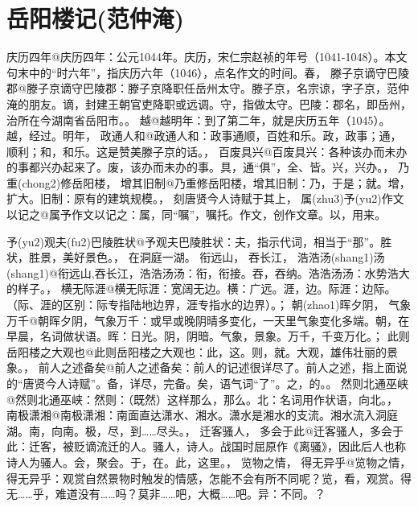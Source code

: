 \documentclass[a4paper]{article}
\begin{document}
\section[]{岳阳楼记(\fangti 范仲淹)\zynotemark{}}


庆历四年@{庆历四年：公元1044年。庆历，宋仁宗赵祯的年号（1041-1048）。本文句末中的“时六年”，指庆历六年（1046），点名作文的时间。}春，
滕子京谪守巴陵郡@{滕子京谪守巴陵郡：滕子京降职任岳州太守。滕子京，名宗谅，字子京，范仲淹的朋友。谪，封建王朝官吏降职或远调。守，指做太守。巴陵：郡名，即岳州，治所在今湖南省岳阳市。}。
越@{越明年：到了第二年，就是庆历五年（1045）。越，经过。}明年，
政通人和@{政通人和：政事通顺，百姓和乐。政，政事；通，顺利；和，和乐。这是赞美滕子京的话。}，
百废具兴@{百废具兴：各种该办而未办的事都兴办起来了。废，该办而未办的事。具，通“俱”，全、皆。兴，兴办。}，
乃重(chong2)修岳阳楼，
增其旧制@{乃重修岳阳楼，增其旧制：乃，于是；就。增，扩大。旧制：原有的建筑规模。}，
刻唐贤今人诗赋于其上，
属(zhu3)予(yu2)作文以记之@{属予作文以记之：属，同“嘱”，嘱托。作文，创作文章。以，用来}。

予(yu2)观夫(fu2)巴陵胜状@{予观夫巴陵胜状：夫，指示代词，相当于“那”。胜状，胜景，美好景色。}，
在洞庭一湖。
衔远山，
吞长江，
浩浩汤(shang1)汤(shang1)@{衔远山,吞长江，浩浩汤汤：衔，衔接。吞，吞纳。浩浩汤汤：水势浩大的样子。}，
横无际涯@{横无际涯：宽阔无边。横：广远。涯，边。际涯：边际。（际、涯的区别：际专指陆地边界，涯专指水的边界）。}；
朝(zhao1)晖夕阴，
气象万千@{朝晖夕阴，气象万千：或早或晚阴晴多变化，一天里气象变化多端。朝，在早晨，名词做状语。晖：日光。阴，阴暗。气象，景象。万千，千变万化。}；
此则岳阳楼之大观也@{此则岳阳楼之大观也：此，这。则，就。大观，雄伟壮丽的景象。}，
前人之述备矣@{前人之述备矣：前人的记述很详尽了。前人之述，指上面说的“唐贤今人诗赋”。备，详尽，完备。矣，语气词“了”。之，的。}。
然则北通巫峡@{然则北通巫峡：然则：（既然）这样那么，那么。北：名词用作状语，向北。}，
南极潇湘@{南极潇湘：南面直达潇水、湘水。潇水是湘水的支流。湘水流入洞庭湖。南，向南。极，尽，到……尽头。}，
迁客骚人，
多会于此@{迁客骚人，多会于此：迁客，被贬谪流迁的人。骚人，诗人。战国时屈原作《离骚》，因此后人也称诗人为骚人。会，聚会。于，在。此，这里。}，
览物之情，
得无异乎@{览物之情，得无异乎：观赏自然景物时触发的情感，怎能不会有所不同呢？览，看，观赏。得无……乎，难道没有……吗？莫非……吧，大概……吧。异：不同。}？
\end{document}
